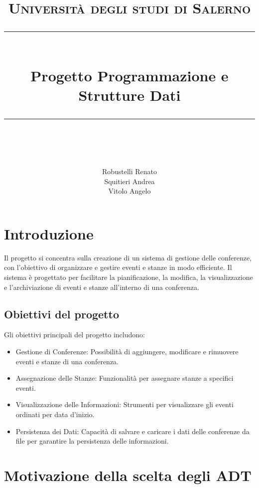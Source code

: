 \documentclass[11pt]{scrartcl} %
\title{
	\normalfont\normalsize
	\textsc{Università degli studi di Salerno}\\ %
	\vspace{25pt} %
	\rule{\linewidth}{0.5pt}\\ %
	\vspace{20pt} %
	{\huge Progetto Programmazione e Strutture Dati}\\ %
	\vspace{12pt} %
	\rule{\linewidth}{2pt}\\ %
	\vspace{12pt} %
}
\author{
	\LARGE
	Robustelli Renato \\
	\LARGE
	Squitieri Andrea \\
	\LARGE
	Vitolo Angelo
} %
\date{\null}
\begin{document}
\maketitle %



\section{Introduzione}




Il progetto si concentra sulla creazione di un sistema di gestione delle conferenze, con l'obiettivo di organizzare e gestire eventi e stanze in modo efficiente. Il sistema è progettato per facilitare la pianificazione, la modifica, la visualizzazione e l'archiviazione di eventi e stanze all'interno di una conferenza.



\subsection{Obiettivi del progetto}
Gli obiettivi principali del progetto includono:

\begin{itemize}
	\item  Gestione di Conferenze: Possibilità di aggiungere, modificare e rimuovere eventi e stanze di una conferenza.
	\item Assegnazione delle Stanze: Funzionalità per assegnare stanze a specifici eventi.
	\item Visualizzazione delle Informazioni: Strumenti per visualizzare gli eventi ordinati per data d'inizio.
	\item Persistenza dei Dati: Capacità di salvare e caricare i dati delle conferenze da file per garantire la persistenza delle informazioni.
\end{itemize}


\section{Motivazione della scelta degli ADT}
\end{document}
